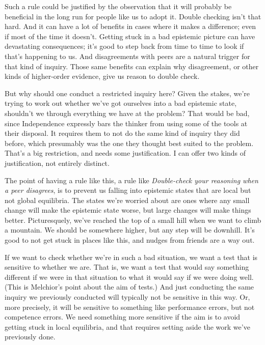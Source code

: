 \documentclass[
  11pt,
]{book}
\begin{document}
Such a rule could be justified by the observation that it will probably be beneficial in the long run for people like us to adopt it. Double checking isn't that hard. And it can have a lot of benefits in cases where it makes a difference; even if most of the time it doesn't. Getting stuck in a bad epistemic picture can have devastating consequences; it's good to step back from time to time to look if that's happening to us. And disagreements with peers are a natural trigger for that kind of inquiry. Those same benefits can explain why disagreement, or other kinds of higher-order evidence, give us reason to double check.

But why should one conduct a restricted inquiry here? Given the stakes, we're trying to work out whether we've got ourselves into a bad epistemic state, shouldn't we through everything we have at the problem? That would be bad, since Independence expressly bars the thinker from using some of the tools at their disposal. It requires them to not do the same kind of inquiry they did before, which presumably was the one they thought best suited to the problem. That's a big restriction, and needs some justification. I can offer two kinds of justification, not entirely distinct.

The point of having a rule like this, a rule like \emph{Double-check your reasoning when a peer disagrees}, is to prevent us falling into epistemic states that are local but not global equilibria. The states we're worried about are ones where any small change will make the epistemic state worse, but large changes will make things better. Picturesquely, we've reached the top of a small hill when we want to climb a mountain. We should be somewhere higher, but any step will be downhill. It's good to not get stuck in places like this, and nudges from friends are a way out.

If we want to check whether we're in such a bad situation, we want a test that is sensitive to whether we are. That is, we want a test that would say something different if we were in that situation to what it would say if we were doing well. (This is Melchior's point about the aim of tests.) And just conducting the same inquiry we previously conducted will typically not be sensitive in this way. Or, more precisely, it will be sensitive to something like performance errors, but not competence errors. We need something more sensitive if the aim is to avoid getting stuck in local equilibria, and that requires setting aside the work we've previously done.
\end{document}
